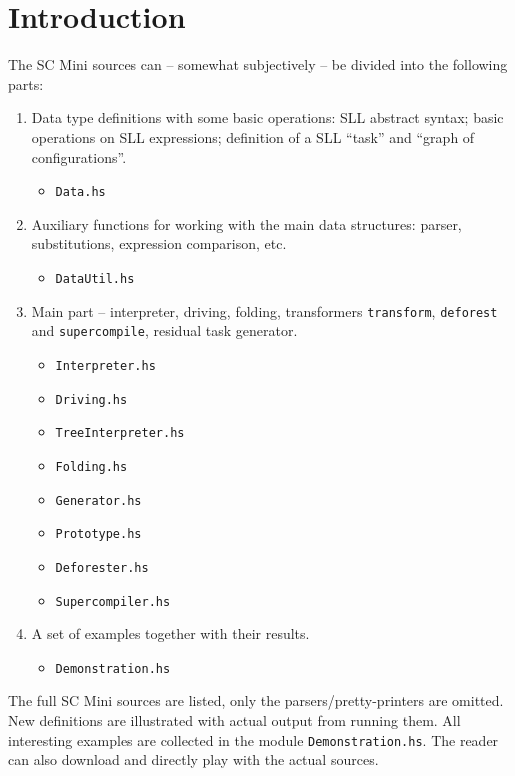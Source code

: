 \section*{Introduction}

The SC Mini sources can -- somewhat subjectively -- be divided into the following parts:
\begin{enumerate}
  \item Data type definitions with some basic operations: SLL abstract syntax;
  basic operations on SLL expressions; definition of a SLL ``task''
  and ``graph of configurations''.
  	\begin{itemize}
  	\item \texttt{Data.hs}
  	\end{itemize}
  \item Auxiliary functions for working with the main data structures: parser, substitutions, expression comparison, etc.
  	\begin{itemize}
  	\item \texttt{DataUtil.hs}
  	\end{itemize}
  \item Main part -- interpreter, driving, folding, transformers \texttt{transform},
  \texttt{deforest} and \texttt{supercompile}, residual task generator.
  	\begin{itemize}
  	 \item \texttt{Interpreter.hs}
  	 \item \texttt{Driving.hs}
  	 \item \texttt{TreeInterpreter.hs}
  	 \item \texttt{Folding.hs}
  	 \item \texttt{Generator.hs}
  	 \item \texttt{Prototype.hs}
  	 \item \texttt{Deforester.hs}
  	 \item \texttt{Supercompiler.hs}
  	\end{itemize}
  \item A set of examples together with their results.
  	\begin{itemize}
  	\item \texttt{Demonstration.hs}
  	\end{itemize}
\end{enumerate}

The full SC Mini sources are listed, only the parsers/pretty-printers are omitted.
New definitions are illustrated with actual output from running them.
All interesting examples are collected in the module \texttt{Demonstration.hs}. 
The reader can also download and directly play with the actual sources.

